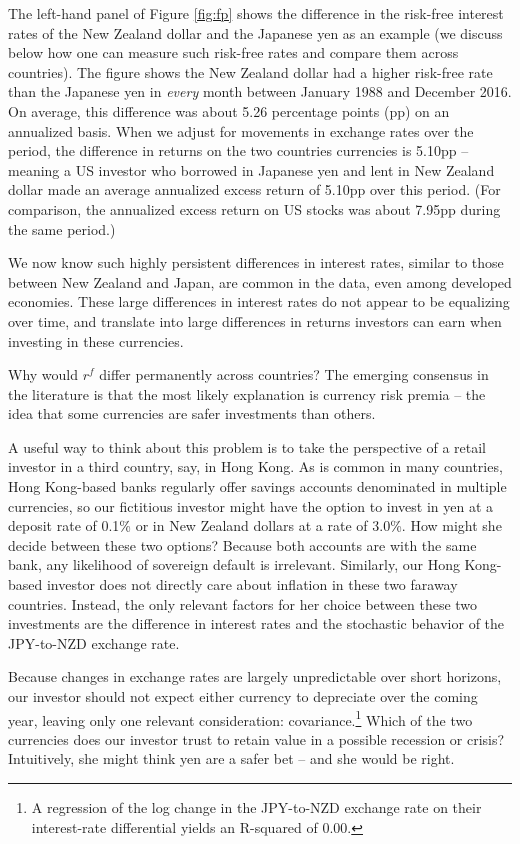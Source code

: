 \documentclass[11pt]{article}
\begin{document}
The left-hand panel of Figure \ref{fig:fp} shows the difference in the risk-free interest rates of the New Zealand dollar and the Japanese yen as an example (we discuss below how one can measure such risk-free rates and compare them across countries). The figure shows the New Zealand dollar had a higher risk-free rate than the Japanese yen in \textit{every} month between January 1988 and December 2016. On average, this difference was about 5.26 percentage points (pp) on an annualized basis. When we adjust for movements in exchange rates over the period, the difference in returns on the two countries currencies is 5.10pp -- meaning a US investor who borrowed in Japanese yen and lent in New Zealand dollar made an average annualized excess return of 5.10pp over this period. (For comparison, the annualized excess return on US stocks was about 7.95pp during the same period.)

We now know such highly persistent differences in interest rates, similar to those between New Zealand and Japan, are common in the data, even among developed economies. These large differences in interest rates do not appear to be equalizing over time, and translate into large differences in returns investors can earn when investing in these currencies.

Why would $r^f$ differ permanently across countries? The emerging consensus in the literature is that the most likely explanation is currency risk premia -- the idea that some currencies are safer investments than others.

A useful way to think about this problem is to take the perspective of a retail investor in a third country, say, in Hong Kong. As is common in many countries, Hong Kong-based banks regularly offer savings accounts denominated in multiple currencies, so our fictitious investor might have the option to invest in yen at a deposit rate of 0.1\% or in New Zealand dollars at a rate of 3.0\%. How might she decide between these two options? Because both accounts are with the same bank, any likelihood of sovereign default is irrelevant. Similarly, our Hong Kong-based investor does not directly care about inflation in these two faraway countries. Instead, the only relevant factors for her choice between these two investments are the difference in interest rates and the stochastic behavior of the JPY-to-NZD exchange rate.

Because changes in exchange rates are largely unpredictable over short horizons, our investor should not expect either currency to depreciate over the coming year, leaving only one relevant consideration: covariance.\footnote{A regression of the log change in the JPY-to-NZD exchange rate on their interest-rate differential yields an R-squared of 0.00.} Which of the two currencies does our investor trust to retain value in a possible recession or crisis? Intuitively, she might think yen are a safer bet -- and she would be right.
\end{document}
